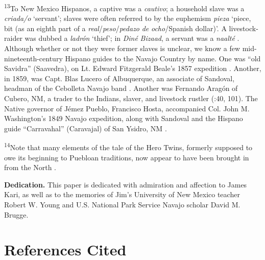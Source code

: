 \textsuperscript{13}To New Mexico Hispanos, a captive was a \textit{cautivo}; a household slave was a \textit{criada/o} ‘servant’; slaves were often referred to by the euphemism \textit{pieza} ‘piece, bit (as an eighth part of a \textit{real}/\textit{peso}/\textit{pedazo} \textit{de} \textit{ocho}/Spanish dollar)’.  A livestock-raider was dubbed a \textit{ladrón} ‘thief’; in \textit{Diné} \textit{Bizaad}, a servant was a \textit{naalté} \citep[374]{Brooks2002}. Although whether or not they were former slaves is unclear, we know a few mid-nineteenth-century Hispano guides to the Navajo Country by name.  One was “old Savidra” (Saavedra), on Lt. Edward Fitzgerald Beale’s 1857 expedition \citep[87]{Stacey1929}.  Another, in 1859, was Capt. Blas Lucero of Albuquerque, an associate of Sandoval, headman of the Cebolleta Navajo band \citep[29]{Correll1970}.  Another was Fernando Aragón of Cubero, NM, a trader to the Indians, slaver, and livestock rustler (\citealt{Bailey1964a}:40, 101).  The Native governor of Jémez Pueblo, Francisco Hosta, accompanied Col. John M. Washington’s 1849 Navajo expedition, along with Sandoval and the Hispano guide “Carravahal” (Caravajal) of San Ysidro, NM \citep[25]{McNitt1964}.

\textsuperscript{14}Note that many elements of the tale of the Hero Twins, formerly supposed to owe its beginning to Puebloan traditions, now appear to have been brought in from the North \citep{Wilson2015}.

\textbf{Dedication.}  This paper is dedicated with admiration and affection to James Kari, as well as to the memories of Jim’s University of New Mexico teacher Robert W. Young and U.S. National Park Service Navajo scholar David M. Brugge.

\section{\rmfamily\bfseries} 
\section{\rmfamily\bfseries} 
\section{\rmfamily\bfseries} 
\section{\rmfamily\bfseries} 
\section{References \textbf{Cited} }

